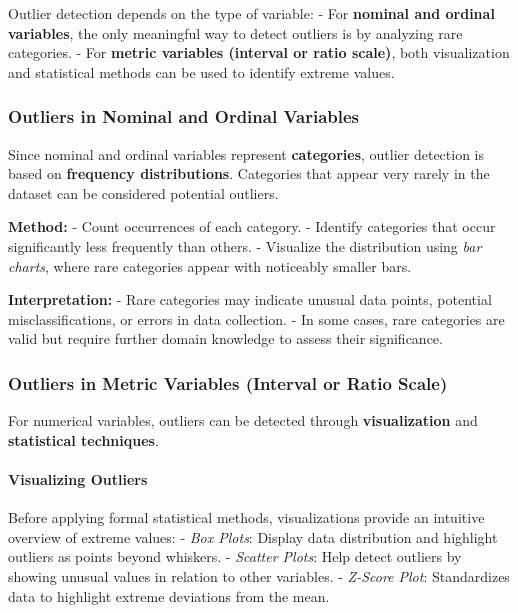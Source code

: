 \documentclass[12pt,openany, draft]{book}
\begin{document}
Outlier detection depends on the type of variable:  
\newline
- For \textbf{nominal and ordinal variables}, the only meaningful way to detect 
  outliers is by analyzing rare categories.  
\newline
- For \textbf{metric variables (interval or ratio scale)}, both visualization and 
  statistical methods can be used to identify extreme values.
\newline

\subsubsection{Outliers in Nominal and Ordinal Variables}

Since nominal and ordinal variables represent \textbf{categories}, outlier detection 
is based on \textbf{frequency distributions}. Categories that appear very rarely in 
the dataset can be considered potential outliers.
\newline

\textbf{Method:}  
\newline
- Count occurrences of each category.  
- Identify categories that occur significantly less frequently than others.  
- Visualize the distribution using \textit{bar charts}, where rare categories 
  appear with noticeably smaller bars.
\newline

\textbf{Interpretation:}  
\newline
- Rare categories may indicate unusual data points, potential misclassifications, 
  or errors in data collection.  
- In some cases, rare categories are valid but require further domain knowledge 
  to assess their significance.  
\newline

\subsubsection{Outliers in Metric Variables (Interval or Ratio Scale)}

For numerical variables, outliers can be detected through \textbf{visualization} 
and \textbf{statistical techniques}.
\newline

\paragraph{Visualizing Outliers}
Before applying formal statistical methods, visualizations provide an intuitive 
overview of extreme values:
\newline
- \textit{Box Plots}: Display data distribution and highlight outliers as 
  points beyond whiskers.
\newline
- \textit{Scatter Plots}: Help detect outliers by showing unusual values in 
  relation to other variables.
\newline
- \textit{Z-Score Plot}: Standardizes data to highlight extreme deviations 
  from the mean.
\newline
\end{document}
